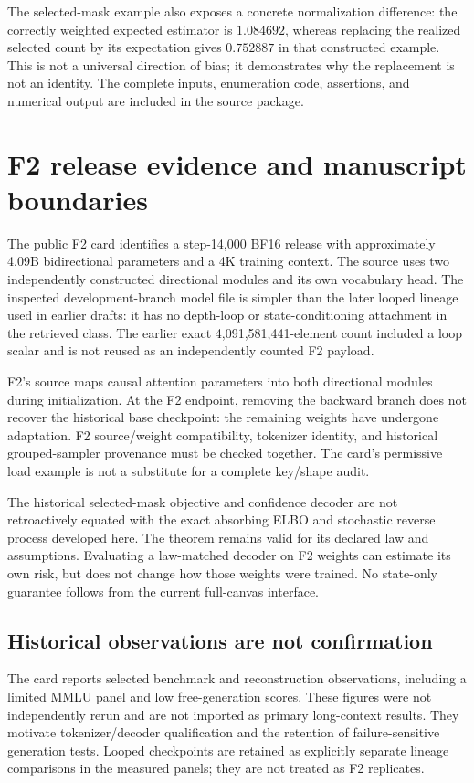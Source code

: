 \documentclass{article}
\theoremstyle{remark}\newtheorem{remark}[theorem]{Remark}
\begin{document}
The selected-mask example also exposes a concrete normalization difference: the correctly weighted expected estimator is $1.084692$, whereas replacing the realized selected count by its expectation gives $0.752887$ in that constructed example. This is not a universal direction of bias; it demonstrates why the replacement is not an identity. The complete inputs, enumeration code, assertions, and numerical output are included in the source package.

\section{F2 release evidence and manuscript boundaries}
\label{app:evidence}
The public F2 card identifies a step-14,000 BF16 release with approximately 4.09B bidirectional parameters and a 4K training context. The source uses two independently constructed directional modules and its own vocabulary head. The inspected development-branch model file is simpler than the later looped lineage used in earlier drafts: it has no depth-loop or state-conditioning attachment in the retrieved class. The earlier exact 4,091,581,441-element count included a loop scalar and is not reused as an independently counted F2 payload.

F2's source maps causal attention parameters into both directional modules during initialization. At the F2 endpoint, removing the backward branch does not recover the historical base checkpoint: the remaining weights have undergone adaptation. F2 source/weight compatibility, tokenizer identity, and historical grouped-sampler provenance must be checked together. The card's permissive load example is not a substitute for a complete key/shape audit.

The historical selected-mask objective and confidence decoder are not retroactively equated with the exact absorbing ELBO and stochastic reverse process developed here. The theorem remains valid for its declared law and assumptions. Evaluating a law-matched decoder on F2 weights can estimate its own risk, but does not change how those weights were trained. No state-only guarantee follows from the current full-canvas interface.

\subsection{Historical observations are not confirmation}
The card reports selected benchmark and reconstruction observations, including a limited MMLU panel and low free-generation scores. These figures were not independently rerun and are not imported as primary long-context results. They motivate tokenizer/decoder qualification and the retention of failure-sensitive generation tests. Looped checkpoints are retained as explicitly separate lineage comparisons in the measured panels; they are not treated as F2 replicates.
\end{document}
